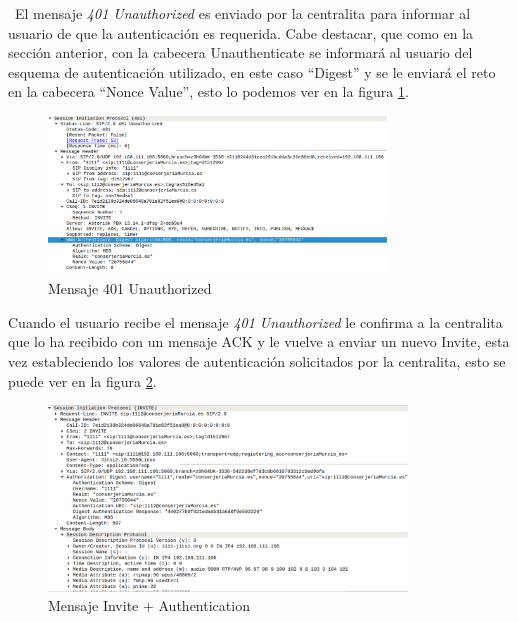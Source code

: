 \documentclass[a4paper]{article}
\begin{document}
\ El mensaje \textit{401 Unauthorized} es enviado por la centralita para informar al usuario de que la autenticación es requerida. Cabe destacar, que como en la sección anterior, con la cabecera Unauthenticate se informará al usuario del esquema de autenticación utilizado, en este caso ``Digest'' y se le enviará el reto en la cabecera ``Nonce Value'', esto lo podemos ver en la figura \ref{fig:invite-unauthz}.
\newpage
\begin{figure}
    \begin{center}
    
        \includegraphics[width=0.8\textwidth]{unauthorized-invite.png}
        \caption{Mensaje 401 Unauthorized}
         \label{fig:invite-unauthz}
    \end{center}
\end{figure}

Cuando el usuario recibe el mensaje \textit{401 Unauthorized} le confirma a la centralita que lo ha recibido con un mensaje ACK y le vuelve a enviar un nuevo Invite, esta vez estableciendo los valores de autenticación solicitados por la centralita, esto se puede ver en la figura \ref{fig:invite-authz}.

\begin{figure}[htb]
    \begin{center}
    
        \includegraphics[width=0.85\textwidth]{invite-authz.png}
        \caption{Mensaje Invite + Authentication}
         \label{fig:invite-authz}
    \end{center}
\end{figure}
\end{document}

